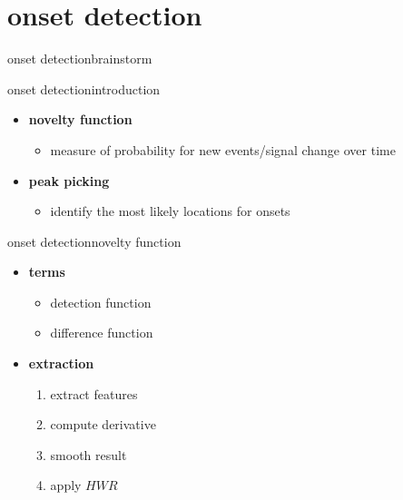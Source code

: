     \section[onsets]{onset detection}
        \begin{frame}{onset detection}{brainstorm}
        \end{frame}
        \begin{frame}{onset detection}{introduction}
            \begin{figure}
                \centering
                
            \end{figure}
            
            \begin{itemize}
                \item<2-> 	\textbf{novelty function}
                    \begin{itemize}
                        \item	measure of probability for new events/signal change over time	
                    \end{itemize}
                
                \bigskip
                \item<3->	\textbf{peak picking}
                    \begin{itemize}
                        \item	identify the most likely locations for onsets
                    \end{itemize}
            \end{itemize}
        \end{frame}
        \begin{frame}{onset detection}{novelty function}
            \begin{itemize}
                \item	\textbf{terms}
                    \begin{itemize}
                        \item	detection function
                        \item	difference function
                    \end{itemize}
                \bigskip
                \item<2->	\textbf{extraction}
                    \begin{enumerate}
                        \item<2->	extract features
                        \item<3->	compute derivative
                        \item<4->	smooth result
                        \item<5->	apply $HWR$
                    \end{enumerate}
            \end{itemize}
        \end{frame}
